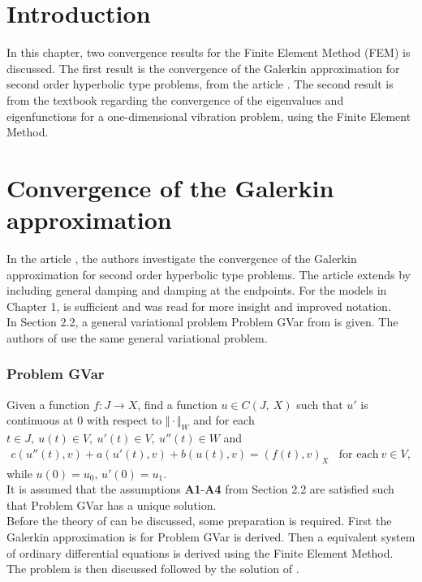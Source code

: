 \documentclass[../../main.tex]{subfiles}
\begin{document}
\section{Introduction}
In this chapter, two convergence results for the Finite Element Method (FEM) is discussed. The first result is the convergence of the Galerkin approximation for second order hyperbolic type problems, from the article \cite{BV13}. The second result is from the textbook \cite{SF97} regarding the convergence of the eigenvalues and eigenfunctions for a one-dimensional vibration problem, using the Finite Element Method.

\section{Convergence of the Galerkin approximation}
In the article \cite{BV13}, the authors investigate the convergence of the Galerkin approximation for second order hyperbolic type problems. The article \cite{BV18} extends \cite{BV13} by including general damping and damping at the endpoints. For the models in Chapter 1, \cite{BV13} is sufficient and \cite{BV18} was read for more insight and improved notation.\\

In Section 2.2, a general variational problem Problem GVar from \cite{VV02} is given. The authors of \cite{BV13} use the same general variational problem.

\subsubsection*{Problem GVar}
Given a function $f:J\rightarrow X$, find a function $u\in C(J,\ X)$ such that $u'$ is continuous at $0$ with respect to $\Vert \cdot \Vert_{W}$ and for each $t\in J,\ u(t)\in V,\ u'(t) \in V,\ u''(t)\in W$ and
\begin{eqnarray}
	c(u''(t),v)+a(u'(t),v)+b(u(t),v)= (f(t),v)_{X} \ \ \ \ \textrm{for each} \ v \in V, \label{GV_PB1}
\end{eqnarray}
while $u(0)=u_{0}$, $u'(0)=u_{1}$.\\

It is assumed that the assumptions \textbf{A1}-\textbf{A4} from Section 2.2 are satisfied such that Problem GVar has a unique solution.\\

Before the theory of \cite{BV13} can be discussed, some preparation is required. First the Galerkin approximation is for Problem GVar is derived. Then a equivalent system of ordinary differential equations is derived using the Finite Element Method. The problem is then discussed followed by the solution of \cite{BV13}.\\
\end{document}
